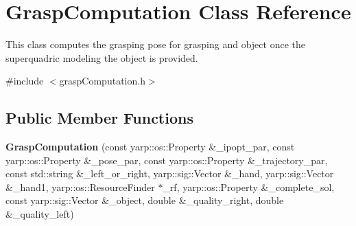 \section{Grasp\+Computation Class Reference}
\label{classGraspComputation}


This class computes the grasping pose for grasping and object once the superquadric modeling the object is provided.  




{\ttfamily \#include $<$grasp\+Computation.\+h$>$}

\subsection*{Public Member Functions}
\begin{DoxyCompactItemize}
\item 
{\bfseries Grasp\+Computation} (const yarp\+::os\+::\+Property \&\+\_\+ipopt\+\_\+par, const yarp\+::os\+::\+Property \&\+\_\+pose\+\_\+par, const yarp\+::os\+::\+Property \&\+\_\+trajectory\+\_\+par, const std\+::string \&\+\_\+left\+\_\+or\+\_\+right, yarp\+::sig\+::\+Vector \&\+\_\+hand, yarp\+::sig\+::\+Vector \&\+\_\+hand1, yarp\+::os\+::\+Resource\+Finder $\ast$\+\_\+rf, yarp\+::os\+::\+Property \&\+\_\+complete\+\_\+sol, const yarp\+::sig\+::\+Vector \&\+\_\+object, double \&\+\_\+quality\+\_\+right, double \&\+\_\+quality\+\_\+left)\label{classGraspComputation_a8568147ac89fff96794d84139eb16aa3}


\end{DoxyCompactItemize}
